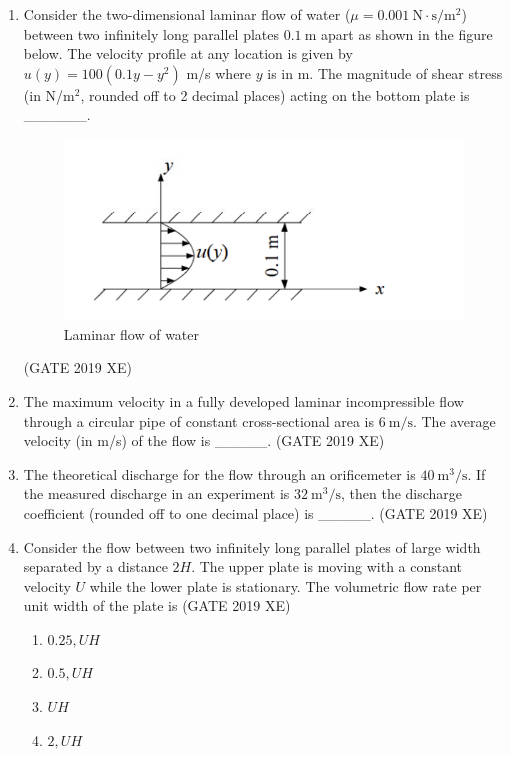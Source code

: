 \documentclass[journal,12pt,onecolumn]{IEEEtran}
\begin{document}
\begin{enumerate}
\item Consider the two-dimensional laminar flow of water ($\mu=0.001\ \mathrm{N\cdot s/m^2}$) between two infinitely long parallel plates $0.1\ \mathrm{m}$ apart as shown in the figure below. The velocity profile at any location is given by $u(y)=100(0.1y-y^2)$ m/s where $y$ is in m. The magnitude of shear stress (in N/m$^2$, rounded off to 2 decimal places) acting on the bottom plate is \_\_\_\_\_\_.

\begin{figure}[htbp]
  \centering
  \includegraphics[width=.7\columnwidth]{figs/B/fig1.png}
  \caption{Laminar flow of water}
  \label{fig:figs/B/fig1.png}
\end{figure}

\hfill{(GATE 2019 XE)} \\


\item The maximum velocity in a fully developed laminar incompressible flow through a circular pipe of constant cross-sectional area is $6\ \mathrm{m/s}$. The average velocity (in m/s) of the flow is \_\_\_\_\_.
\hfill{(GATE 2019 XE)} \\


\item The theoretical discharge for the flow through an orificemeter is $40\ \mathrm{m^3/s}$. If the measured discharge in an experiment is $32\ \mathrm{m^3/s}$, then the discharge coefficient (rounded off to one decimal place) is \_\_\_\_\_.
\hfill{(GATE 2019 XE)} \\


\item Consider the flow between two infinitely long parallel plates of large width separated by a distance $2H$. The upper plate is moving with a constant velocity $U$ while the lower plate is stationary. The volumetric flow rate per unit width of the plate is
\hfill{(GATE 2019 XE)} \\
\begin{multicols}{2}
\begin{enumerate}
\item $0.25, U H$
\item $0.5, U H$
\item $U H$
\item $2, U H$
\end{enumerate}
\end{multicols}


\end{enumerate}
\end{document}
